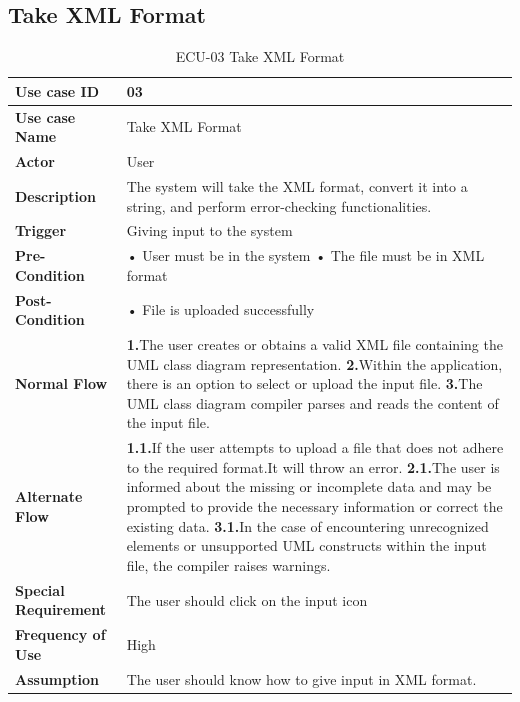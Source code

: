\documentclass[12pt,a4paper]{article}
\begin{document}
\clearpage
    \subsection{Take XML Format}
\begin{table}[h!]
\caption{ECU-03 Take XML Format}
    \centering
    \begin{tabular}{|l|p{10cm}|}
    \hline
       \textbf{Use case ID}&03 \\ %
       \hline
       \textbf{Use case Name}&Take XML Format \\ %
       \hline
       \textbf{Actor}&User \\ %
       \hline
       \textbf{Description}&The system will take the XML format, convert it into a string, and perform error-checking functionalities.\\ %
       \hline
       \textbf{Trigger}&Giving input to the system\\ %
        \hline
       \textbf{Pre-Condition}&
   \newline • User must be in the system
    \newline • The file must be in XML format
\\ %
        \hline
       \textbf{Post-Condition}& • File is uploaded successfully
 \\ %
        \hline
       \textbf{Normal Flow}&
    \textbf{1.}The user creates or obtains a valid XML file containing the UML class diagram representation.
\newline\textbf{2.}Within the application, there is an option to select or upload the input file.
\newline\textbf{3.}The UML class diagram compiler parses and reads the content of the input file. \\ %
\hline
       \textbf{Alternate Flow}&
        \textbf{1.1.}If the user attempts to upload a file that does not adhere to the required format.It will throw an error.
\newline\textbf{2.1.}The user is informed about the missing or incomplete data and may be prompted to provide the necessary information or correct the existing data.
\newline\textbf{3.1.}In the case of encountering unrecognized elements or unsupported UML constructs within the input file, the compiler raises warnings.\\ %
        \hline
       \textbf{Special Requirement}&The user should click on the input icon \\ %
        \hline
       \textbf{Frequency of Use}&High \\ %
        \hline
       \textbf{Assumption}&The user should know how to give input in XML format. \\ %
       \hline
    \end{tabular} 
    \end{table}
\end{document}
